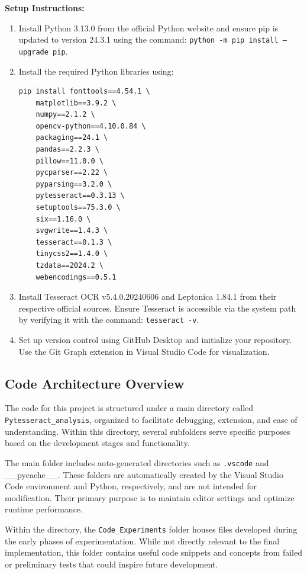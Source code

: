 \documentclass[10pt,twocolumn]{article}
\begin{document}
\textbf{Setup Instructions:}
\begin{enumerate}
    \item Install Python 3.13.0 from the official Python website and ensure pip is updated to version 24.3.1 using the command:
    \texttt{python -m pip install --upgrade pip}.
    \item Install the required Python libraries using:
\begin{verbatim}
pip install fonttools==4.54.1 \
    matplotlib==3.9.2 \
    numpy==2.1.2 \
    opencv-python==4.10.0.84 \
    packaging==24.1 \
    pandas==2.2.3 \
    pillow==11.0.0 \
    pycparser==2.22 \
    pyparsing==3.2.0 \
    pytesseract==0.3.13 \
    setuptools==75.3.0 \
    six==1.16.0 \
    svgwrite==1.4.3 \
    tesseract==0.1.3 \
    tinycss2==1.4.0 \
    tzdata==2024.2 \
    webencodings==0.5.1
\end{verbatim}
    \item Install Tesseract OCR v5.4.0.20240606 and Leptonica 1.84.1 from their respective official sources. Ensure Tesseract is accessible via the system path by verifying it with the command:
    \texttt{tesseract -v}.
    \item Set up version control using GitHub Desktop and initialize your repository. Use the Git Graph extension in Visual Studio Code for visualization.
\end{enumerate}
\subsection{Code Architecture Overview}

The code for this project is structured under a main directory called \texttt{Pytesseract\_analysis}, organized to facilitate debugging, extension, and ease of understanding. Within this directory, several subfolders serve specific purposes based on the development stages and functionality.

The main folder includes auto-generated directories such as \texttt{.vscode} and \_\_pycache\_\_. These folders are automatically created by the Visual Studio Code environment and Python, respectively, and are not intended for modification. Their primary purpose is to maintain editor settings and optimize runtime performance.

Within the directory, the \texttt{Code\_Experiments} folder houses files developed during the early phases of experimentation. While not directly relevant to the final implementation, this folder contains useful code snippets and concepts from failed or preliminary tests that could inspire future development.
\end{document}
